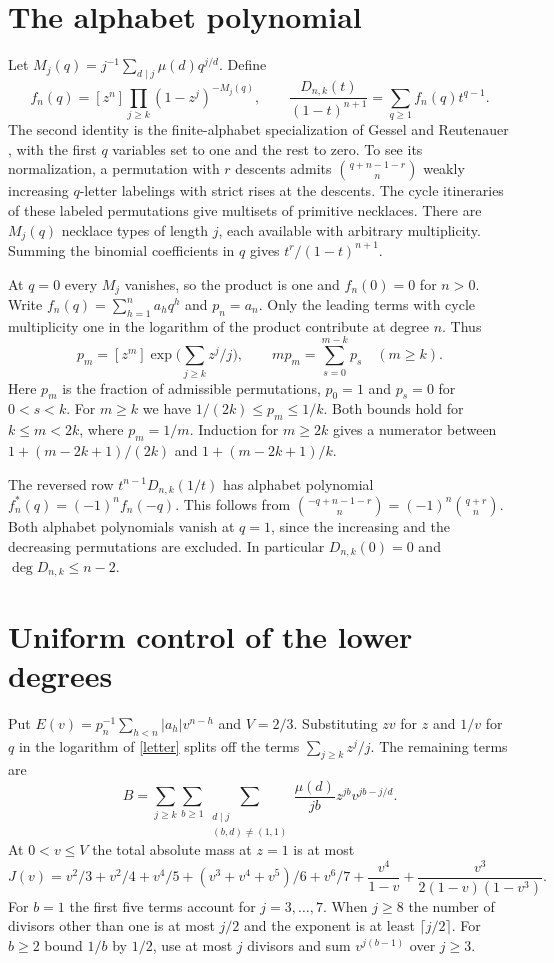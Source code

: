 \documentclass[11pt]{article}
\begin{document}
\section{The alphabet polynomial}
Let $M_j(q)=j^{-1}\sum_{d\mid j}\mu(d)q^{j/d}$. Define
\begin{equation}\label{letter}
 f_n(q)=[z^n]\prod_{j\ge k}(1-z^j)^{-M_j(q)},\qquad
 \frac{D_{n,k}(t)}{(1-t)^{n+1}}=\sum_{q\ge1}f_n(q)t^{q-1}.
\end{equation}
The second identity is the finite-alphabet specialization of Gessel and Reutenauer \cite[Theorem~3.6]{gr}, with the first $q$ variables set to one and the rest to zero. To see its normalization, a permutation with $r$ descents admits $\binom{q+n-1-r}{n}$ weakly increasing $q$-letter labelings with strict rises at the descents. The cycle itineraries of these labeled permutations give multisets of primitive necklaces. There are $M_j(q)$ necklace types of length $j$, each available with arbitrary multiplicity. Summing the binomial coefficients in $q$ gives $t^r/(1-t)^{n+1}$.

At $q=0$ every $M_j$ vanishes, so the product is one and $f_n(0)=0$ for $n>0$. Write $f_n(q)=\sum_{h=1}^n a_h q^h$ and $p_n=a_n$. Only the leading terms with cycle multiplicity one in the logarithm of the product contribute at degree $n$. Thus
\[
 p_m=[z^m]\exp\Big(\sum_{j\ge k}z^j/j\Big),\qquad
 m p_m=\sum_{s=0}^{m-k}p_s\quad(m\ge k).
\]
Here $p_m$ is the fraction of admissible permutations, $p_0=1$ and $p_s=0$ for $0<s<k$. For $m\ge k$ we have $1/(2k)\le p_m\le1/k$. Both bounds hold for $k\le m<2k$, where $p_m=1/m$. Induction for $m\ge2k$ gives a numerator between $1+(m-2k+1)/(2k)$ and $1+(m-2k+1)/k$.

The reversed row $t^{n-1}D_{n,k}(1/t)$ has alphabet polynomial $f_n^*(q)=(-1)^nf_n(-q)$. This follows from
$\binom{-q+n-1-r}{n}=(-1)^n\binom{q+r}{n}$. Both alphabet polynomials vanish at $q=1$, since the increasing and the decreasing permutations are excluded. In particular $D_{n,k}(0)=0$ and $\deg D_{n,k}\le n-2$.

\section{Uniform control of the lower degrees}
Put $E(v)=p_n^{-1}\sum_{h<n}|a_h|v^{n-h}$ and $V=2/3$. Substituting $zv$ for $z$ and $1/v$ for $q$ in the logarithm of \eqref{letter} splits off the terms $\sum_{j\ge k}z^j/j$. The remaining terms are
\[
 B=\sum_{j\ge k}\sum_{b\ge1}
 \sum_{\substack{d\mid j\\(b,d)\ne(1,1)}}
 \frac{\mu(d)}{jb}z^{jb}v^{jb-j/d}.
\]
At $0<v\le V$ the total absolute mass at $z=1$ is at most
\[
 J(v)=v^2/3+v^2/4+v^4/5+(v^3+v^4+v^5)/6+v^6/7
       +\frac{v^4}{1-v}+\frac{v^3}{2(1-v)(1-v^3)}.
\]
For $b=1$ the first five terms account for $j=3,\ldots,7$. When $j\ge8$ the number of divisors other than one is at most $j/2$ and the exponent is at least $\lceil j/2\rceil$. For $b\ge2$ bound $1/b$ by $1/2$, use at most $j$ divisors and sum $v^{j(b-1)}$ over $j\ge3$.
\end{document}
